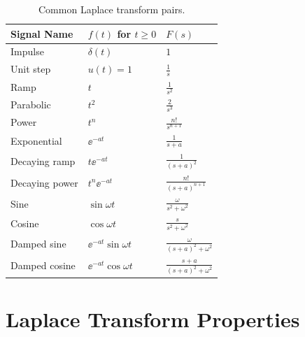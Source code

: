 \begin{table}[htbp]
\centering
\begin{tabular}{lll}
\toprule
\textbf{Signal Name} & $f(t)$ for $t \geq 0$ & $F(s)$ \\
\midrule
Impulse & $\delta(t)$ & $1$ \\
Unit step & $u(t) = 1$ & $\frac{1}{s}$ \\
Ramp & $t$ & $\frac{1}{s^2}$ \\
Parabolic & $t^2$ & $\frac{2}{s^3}$ \\
Power & $t^n$ & $\frac{n!}{s^{n+1}}$ \\
Exponential & $\ee^{-at}$ & $\frac{1}{s+a}$ \\
Decaying ramp & $t\ee^{-at}$ & $\frac{1}{(s+a)^2}$ \\
Decaying power & $t^n\ee^{-at}$ & $\frac{n!}{(s+a)^{n+1}}$ \\
Sine & $\sin\omega t$ & $\frac{\omega}{s^2+\omega^2}$ \\
Cosine & $\cos\omega t$ & $\frac{s}{s^2+\omega^2}$ \\
Damped sine & $\ee^{-at}\sin\omega t$ & $\frac{\omega}{(s+a)^2+\omega^2}$ \\
Damped cosine & $\ee^{-at}\cos\omega t$ & $\frac{s+a}{(s+a)^2+\omega^2}$ \\
\bottomrule
\end{tabular}
\caption{Common Laplace transform pairs.}
\label{tab:laplace_pairs}
\end{table}



\section{Laplace Transform Properties}

